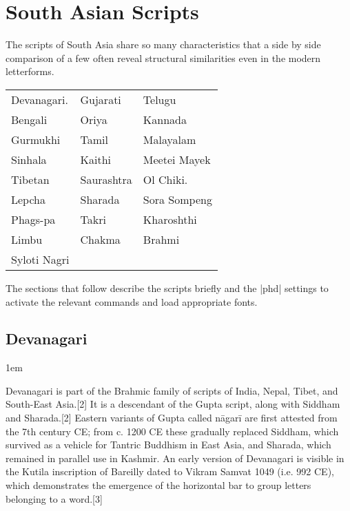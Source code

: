 
\arial


\chapter{South Asian Scripts}

The scripts of South Asia share so many characteristics that a side by side comparison of a few often reveal structural similarities even in the 
modern letterforms.
\medskip

\begin{center}
\begin{tabular}{lll}
Devanagari. &Gujarati &Telugu\\
Bengali   &Oriya &Kannada\\
Gurmukhi &Tamil  &Malayalam\\
Sinhala &Kaithi  &Meetei Mayek\\
Tibetan &Saurashtra &Ol Chiki.\\
Lepcha  &Sharada &Sora Sompeng\\
Phags-pa &Takri &Kharoshthi\\
Limbu &Chakma & Brahmi\\
Syloti Nagri & &\\
\end{tabular}
\end{center}

The sections that follow describe the scripts briefly and the |phd| settings
to activate the relevant commands and load appropriate fonts. 

\section{Devanagari}
\parindent1em

Devanagari is part of the Brahmic family of scripts of India, Nepal, Tibet, and South-East Asia.[2] It is a descendant of the Gupta script, along with Siddham and Sharada.[2] Eastern variants of Gupta called nāgarī are first attested from the 7th century CE; from c. 1200 CE these gradually replaced Siddham, which survived as a vehicle for Tantric Buddhism in East Asia, and Sharada, which remained in parallel use in Kashmir. An early version of Devanagari is visible in the Kutila inscription of Bareilly dated to Vikram Samvat 1049 (i.e. 992 CE), which demonstrates the emergence of the horizontal bar to group letters belonging to a word.[3]

